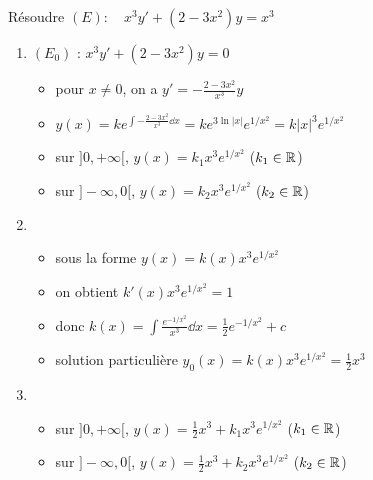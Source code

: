 \begin{frame}
\begin{exemple}
Résoudre $(E) : \quad x^3y'+(2-3x^2)y=x^3$
\pause

\begin{enumerate}
  \item {} $(E_0)$ : $x^3y'+(2-3x^2)y=0$
  \pause
    \begin{itemize}
      \item pour $x\neq 0$, on a $y'=-\frac{2-3x^2}{x^3}y$
     \pause 
      \item $y(x)=k e^{\int -\frac{2-3x^2}{x^3}\dd x}
=k e^{3\ln |x|}e^{1/x^2}=k|x|^3e^{1/x^2}$
\pause
      \item sur $]0,+\infty[$, $y(x)= k_1 x^3e^{1/x^2}$ \quad ($k_1 \in \mathbb{R}$)
     \pause 
      \item sur $]-\infty,0[$, $y(x)= k_2 x^3e^{1/x^2}$ \quad ($k_2 \in \mathbb{R}$)
    
    \end{itemize}
  
\pause
  \item {} 
  \pause
  \begin{itemize}
    \item sous la forme $y(x)=k(x)x^3e^{1/x^2}$
    \pause
    \item on obtient $k'(x) x^3e^{1/x^2} =1$
    \pause
    \item donc $k(x)=\int \frac{e^{-1/x^2}}{x^3}\dd x
    =\frac{1}{2}e^{-1/x^2}+c$
    \pause
    \item solution particulière $y_0(x)=k(x)x^3e^{1/x^2} =\frac{1}{2}x^3$
  \end{itemize}
    
    \pause
    \item {}
    \pause
    \begin{itemize}
      \item sur $]0,+\infty[$, $y(x)=\frac{1}{2}x^3+k_1x^3e^{1/x^2}$ \quad ($k_1 \in \mathbb{R}$)
      \pause
      \item sur $]-\infty,0[$, $y(x)=\frac{1}{2}x^3+k_2x^3e^{1/x^2}$ \quad ($k_2 \in \mathbb{R}$)
    \end{itemize}

  \end{enumerate}
  
\end{exemple}
\end{frame}


